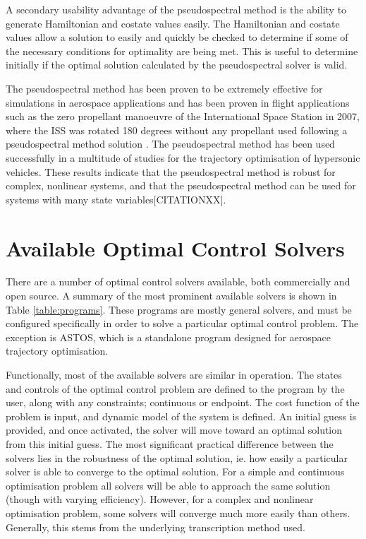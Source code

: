 A secondary usability advantage of the pseudospectral method is the ability to generate Hamiltonian and costate values easily\cite{Gong2010,Fahroo2001,Rao2009}. The Hamiltonian and costate values allow a solution to easily and quickly be checked to determine if some of the necessary conditions for optimality are being met. This is useful to determine initially if the optimal solution calculated by the pseudospectral solver is valid.


The pseudospectral method has been proven to be extremely effective for simulations in aerospace applications and has been proven in flight applications such as the zero propellant manoeuvre of the International Space Station in 2007, where the ISS was rotated 180 degrees without any propellant used following a pseudospectral method solution \cite{Bedrossian}. 
The pseudospectral method has been used successfully in a multitude of studies for the trajectory optimisation of hypersonic vehicles\cite{Li2012,Josselyn2002a,Zhao2013,Tian2011,Darby2011,Chai2015,Rizvi2015,Moshman2014,Yang2017,Kodera2014}. 
These results indicate that the pseudospectral method is robust for complex, nonlinear systems, and that the pseudospectral method can be used for systems with many state variables[CITATIONXX].


\section{Available Optimal Control Solvers}

There are a number of optimal control solvers available, both commercially and open source. A summary of the most prominent available solvers is shown in Table \ref{table:programs}. These programs are mostly general solvers, and must be configured specifically in order to solve a particular optimal control problem. The exception is ASTOS, which is a standalone program designed for aerospace trajectory optimisation.

Functionally, most of the available solvers are similar in operation. The states and controls of the optimal control problem are defined to the program by the user, along with any constraints; continuous or endpoint. The cost function of the problem is input, and dynamic model of the system is defined. An initial guess is provided, and once activated, the solver will move toward an optimal solution from this initial guess. 
The most significant practical difference between the solvers lies in the robustness of the optimal solution, ie. how easily a particular solver is able to converge to the optimal solution. For a simple and continuous optimisation problem all solvers will be able to approach the same solution (though with varying efficiency). However, for a complex and nonlinear optimisation problem, some solvers will converge much more easily than others. Generally, this stems from the underlying transcription method used. 

